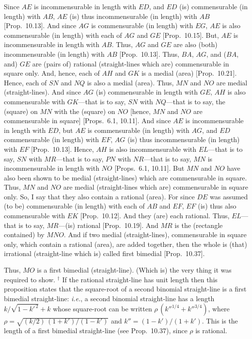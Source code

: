 Since $AE$
is incommensurable in length with $ED$, and $ED$ (is) commensurable 
 (in length) with $AB$, $AE$ (is) thus incommensurable (in length) with $AB$ [Prop.~10.13]. And since $AG$
is commensurable (in length) with $EG$, $AE$ is also commensurable
(in length) with each of $AG$ and $GE$ [Prop.~10.15]. 
But, $AE$ is incommensurable in length with $AB$.  Thus, $AG$ and $GE$
are also (both) 
incommensurable (in length) with $AB$ [Prop.~10.13]. 
Thus, $BA$, $AG$,  and ($BA$, and) $GE$ are (pairs of) rational (straight-lines which are)
commensurable in square only. And, hence, each of $AH$ and $GK$ is a medial
(area) [Prop.~10.21]. Hence, each of $SN$ and $NQ$
is also a medial (area). Thus, $MN$ and $NO$ are medial (straight-lines). 
And since $AG$ (is) commensurable in length with $GE$, $AH$
is also commensurable with $GK$---that is to say, $SN$ with $NQ$---that is to say, the (square)
on $MN$  with the (square) on $NO$ [hence, $MN$ and $NO$
are commensurable in square] [Props.~6.1, 10.11]. And since $AE$ is incommensurable
in length with $ED$, but $AE$ is commensurable (in length) with $AG$,
and $ED$ commensurable (in length) with $EF$, $AG$ (is) thus
incommensurable (in length) with $EF$ [Prop.~10.13]. Hence, $AH$ is also incommensurable with $EL$---that is to say, $SN$ with $MR$---that is to
say, $PN$ with $NR$---that is to say, $MN$ is incommensurable
in length with $NO$  [Props.~6.1, 10.11]. But $MN$ and $NO$ have also
been shown to be medial (straight-lines) which are commensurable in square. 
Thus, $MN$ and $NO$ are medial (straight-lines which are) commensurable
in square only.
So,
I say that they also contain a rational (area). For since $DE$ was assumed
(to be) commensurable (in length) with each of $AB$ and $EF$, $EF$
(is) thus also commensurable with $EK$ [Prop.~10.12]. And they (are) each rational.
Thus, $EL$---that is to say, $MR$---(is) rational [Prop.~10.19]. And $MR$ is the (rectangle contained) by $MNO$. And if two medial (straight-lines), commensurable
in square only, which contain a rational (area), are added together, then the
whole is (that) irrational (straight-line which is)
called first bimedial [Prop.~10.37].

Thus, $MO$ is a first bimedial (straight-line). (Which is) the very thing it
was required to show.
{\footnotesize\noindent$^\dag$ If the rational straight-line has unit length then this proposition states that the square-root of 
a second binomial straight-line is a first bimedial straight-line: {\em i.e.}, 
a second binomial straight-line has a length $k/\sqrt{1-k'^{\,2}}+k$ whose
square-root can be written $\rho\,(k''^{1/4}+k''^{3/4})$, where $\rho=\sqrt{(k/2)\,(1+k')/(1-k')}$ and $k''=(1-k')/(1+k')$. This is the length of a first bimedial straight-line (see Prop.~10.37), since $\rho$ is rational.}

